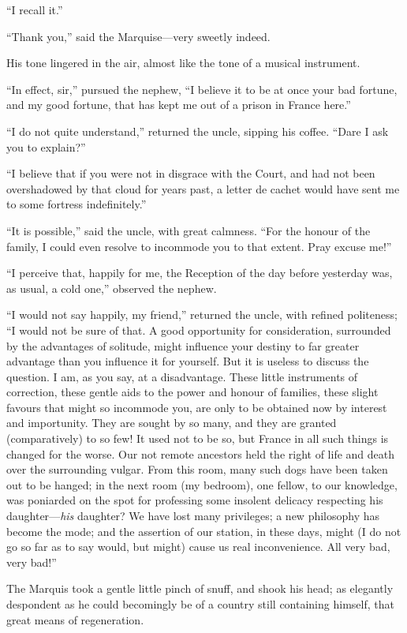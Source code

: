 ``I recall it.''

``Thank you,'' said the Marquise---very sweetly indeed.

His tone lingered in the air, almost like the tone of a musical
instrument.

``In effect, sir,'' pursued the nephew, ``I believe it to be at once
your bad fortune, and my good fortune, that has kept me out of a
prison in France here.''

``I do not quite understand,'' returned the uncle, sipping his coffee.
``Dare I ask you to explain?''

``I believe that if you were not in disgrace with the Court,
and had not been overshadowed by that cloud for years past, a letter
de cachet would have sent me to some fortress indefinitely.''

``It is possible,'' said the uncle, with great calmness.  ``For the
honour of the family, I could even resolve to incommode you to that
extent.  Pray excuse me!''

``I perceive that, happily for me, the Reception of the day before
yesterday was, as usual, a cold one,'' observed the nephew.

``I would not say happily, my friend,'' returned the uncle, with
refined politeness; ``I would not be sure of that.  A good opportunity
for consideration, surrounded by the advantages of solitude, might
influence your destiny to far greater advantage than you influence it
for yourself.  But it is useless to discuss the question.  I am, as
you say, at a disadvantage.  These little instruments of correction,
these gentle aids to the power and honour of families, these slight
favours that might so incommode you, are only to be obtained now by
interest and importunity.  They are sought by so many, and they are
granted (comparatively) to so few!  It used not to be so, but France
in all such things is changed for the worse.  Our not remote
ancestors held the right of life and death over the surrounding
vulgar.  From this room, many such dogs have been taken out to be
hanged; in the next room (my bedroom), one fellow, to our knowledge,
was poniarded on the spot for professing some insolent delicacy
respecting his daughter---\emph{his} daughter?  We have lost many privileges;
a new philosophy has become the mode; and the assertion of our
station, in these days, might (I do not go so far as to say would,
but might) cause us real inconvenience.  All very bad, very bad!''

The Marquis took a gentle little pinch of snuff, and shook his head;
as elegantly despondent as he could becomingly be of a country still
containing himself, that great means of regeneration.

